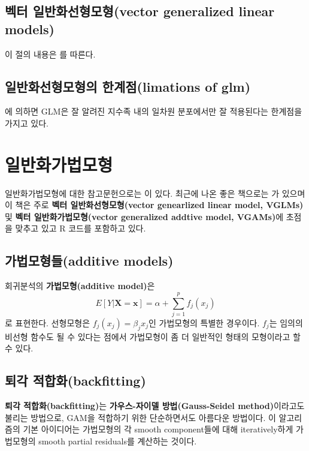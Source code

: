 \documentclass[b5paper,]{scrbook}
\theoremstyle{plain}
\theoremstyle{definition}
\numberwithin{equation}{section}
\begin{document}
\section{벡터 일반화선형모형(vector generalized linear
models)}\label{-vector-generalized-linear-models}

이 절의 내용은 \citep{Yee2015}를 따른다.

\section{일반화선형모형의 한계점(limations of
glm)}\label{-limations-of-glm}

\citep{Yee2015}에 의하면 GLM은 잘 알려진 지수족 내의 일차원 분포에서만
잘 적용된다는 한계점을 가지고 있다.

\chapter{일반화가법모형}\label{gam}

일반화가법모형에 대한 참고문헌으로는 \citep{Wood2006}이 있다. 최근에
나온 좋은 책으로는 \citep{Yee2015}가 있으며 이 책은 주로 \textbf{벡터
일반화선형모형(vector genearlized linear model, VGLMs)} 및 \textbf{벡터
일반화가법모형(vector generalized addtive model, VGAMs)}에 초점을 맞추고
있고 R 코드를 포함하고 있다.

\section{가법모형들(additive models)}\label{additive-models}

회귀분석의 \textbf{가법모형(additive model)}은
\[E[Y|\mathbf{X}=\mathbf{x}]=\alpha+\sum_{j=1}^{p}f_{j}(x_j)\] 로
표현한다. 선형모형은 \(f_{j}(x_{j})=\beta_{j}x_{j}\)인 가법모형의 특별한
경우이다. \(f_{j}\)는 임의의 비선형 함수도 될 수 있다는 점에서
가법모형이 좀 더 일반적인 형태의 모형이라고 할 수 있다.

\section{퇴각 적합화(backfitting)}\label{-backfitting}

\textbf{퇴각 적합화(backfitting)}는 \textbf{가우스-자이델
방법(Gauss-Seidel method)}이라고도 불리는 방법으로, GAM을 적합하기 위한
단순하면서도 아름다운 방법이다. 이 알고리즘의 기본 아이디어는 가법모형의
각 smooth component들에 대해 iteratively하게 가법모형의 smooth partial
residuals를 계산하는 것이다.
\end{document}
